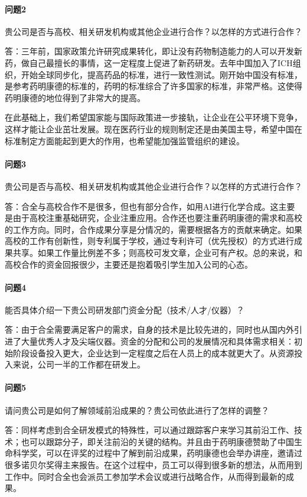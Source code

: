 \documentclass[twocolumn,openany]{ctexbook}
\begin{document}
	\paragraph{问题2}贵公司是否与高校、相关研发机构或其他企业进行合作？以怎样的方式进行合作？
	
	答：三年前，国家政策允许研究成果转化，即让没有药物制造能力的人可以开发新药，做自己最擅长的事情，这一定程度上促进了新药研发。去年中国加入了ICH组织，开始全球同步化，提高药品的标准，进行一致性测试。刚开始中国没有标准，是参考药明康德的标准的，药明的标准综合了许多国家的标准，非常严格。这使得药明康德的地位得到了非常大的提高。
	
	在此基础上，我们希望国家能与国际政策进一步接轨，让企业在公平环境下竞争，这样才能让企业茁壮发展。现在医药行业的规则制定还是由美国主导，希望中国在标准制定方面能起到更大的作用，也希望能加强监管组织的建设。
	
	\paragraph{问题3}贵公司是否与高校、相关研发机构或其他企业进行合作？以怎样的方式进行合作？
	
	答：合全与高校合作不是很多，但也有部分合作，如用AI进行化学合成。这主要是由于高校注重基础研究，企业注重应用。合作还也要注重药明康德的需求和高校的工作方向。同时，合作成果分享是分情况的，需要根据各方的贡献来确定。如果高校的工作有创新性，则专利属于学校，通过专利许可（优先授权）的方式进行成果共享。如果工作量比例差不多；则高校可发文章，企业可有产权。总的来说，和高校合作的资金回报很少，主要还是抱着吸引学生加入公司的心态。
	
	\paragraph{问题4}能否具体介绍一下贵公司研发部门资金分配（技术/人才/仪器）？
	
	答：由于合全需要满足客户的需求，自身的技术是比较先进的，同时也从国内外引进了大量优秀人才及尖端仪器。资金的分配和公司的发展情况和具体需求相关：初始阶段设备投入更大，企业达到一定程度之后在人员上的成本就更大了。从资源投入来说，公司一半的工作都在研发上。
	
	\paragraph{问题5}请问贵公司是如何了解领域前沿成果的？贵公司依此进行了怎样的调整？
	
	答：同样考虑到合全研发模式的特殊性，可以通过跟踪客户来学习其前沿工作、技术；也可以跟踪分子，即关注前沿的关键的结构。并且由于药明康德赞助了中国生命科学奖，可以在评奖的过程中了解到前沿成果，药明康德也会举办讲座，邀请过很多诺贝尔奖得主来报告。在这个过程中，员工可以得到很多新的想法，从而用到工作中。同时合全也会派员工参加学术会议或进行战略合作，从而得到最新的成果。
	
\end{document}
